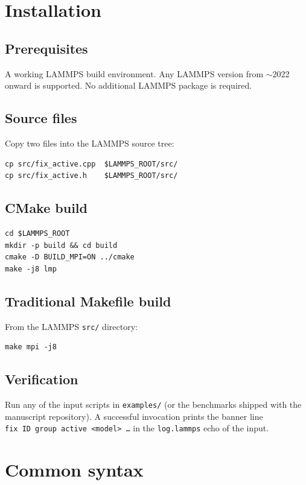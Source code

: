 \documentclass[11pt,a4paper]{article}
\begin{document}
\section{Installation}

\subsection{Prerequisites}
A working LAMMPS build environment.  Any LAMMPS version from $\sim$2022
onward is supported.  No additional LAMMPS package is required.

\subsection{Source files}
Copy two files into the LAMMPS source tree:
\begin{lstlisting}
cp src/fix_active.cpp  $LAMMPS_ROOT/src/
cp src/fix_active.h    $LAMMPS_ROOT/src/
\end{lstlisting}

\subsection{CMake build}
\begin{lstlisting}
cd $LAMMPS_ROOT
mkdir -p build && cd build
cmake -D BUILD_MPI=ON ../cmake
make -j8 lmp
\end{lstlisting}

\subsection{Traditional Makefile build}
From the LAMMPS \texttt{src/} directory:
\begin{lstlisting}
make mpi -j8
\end{lstlisting}

\subsection{Verification}
Run any of the input scripts in \texttt{examples/} (or the benchmarks shipped
with the manuscript repository).  A successful invocation prints the
banner line\\
\texttt{fix\ ID\ group\ active\ <model>\ \dots} in the
\texttt{log.lammps} echo of the input.

\section{Common syntax}
\end{document}
